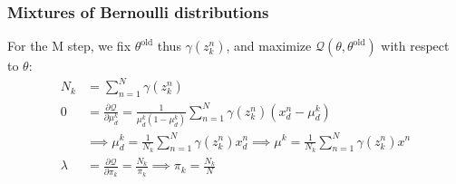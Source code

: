 \documentclass{beamer}
\begin{document}
\begin{frame}
    \frametitle{Mixtures of Bernoulli distributions}
    For the M step, we fix $\theta^{\textrm{old}}$ thus $\gamma(z^{n}_{k})$, and maximize $\mathcal{Q}(\theta,\theta^{\textrm{old}})$ with respect to $\theta$:
    \begin{align*}
        N_{k}&=\sum_{n=1}^{N}\gamma(z^{n}_{k}) \\
        0&=\frac{\partial\mathcal{Q}}{\partial\mu^{k}_{d}}=\frac{1}{\mu^{k}_{d}(1-\mu^{k}_{d})}\sum_{n=1}^{N}\gamma(z^{n}_{k})(x^{n}_{d}-\mu^{k}_{d}) \\
        &\implies\mu^{k}_{d}=\frac{1}{N_{k}}\sum_{n=1}^{N}\gamma(z^{n}_{k})x^{n}_{d}\implies\mu^{k}=\frac{1}{N_{k}}\sum_{n=1}^{N}\gamma(z^{n}_{k})x^{n} \\
        \lambda&=\frac{\partial\mathcal{Q}}{\partial\pi_{k}}=\frac{N_{k}}{\pi_{k}}\implies\pi_{k}=\frac{N_{k}}{N}
    \end{align*}
\end{frame}
\end{document}
